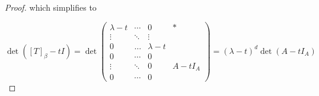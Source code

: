 \documentclass[11pt]{scrartcl}
\begin{document}
\begin{itemize}
\begin{proof}
which simplifies to

\[ \det([T]_{\beta} - tI) = \det \begin{pmatrix}
  \lambda-t &\cdots & 0 & *\\
  \vdots &\ddots & \vdots & \\
  0&\dots&\lambda-t & \\
  0 &\cdots&0& \\
  \vdots &\ddots &0 & A-tI_{A}\\
  0 & \cdots & 0 &
\end{pmatrix} = (\lambda-t)^{d}\det(A-tI_{A})    \]
  \end{proof}

\end{itemize}
\end{document}

